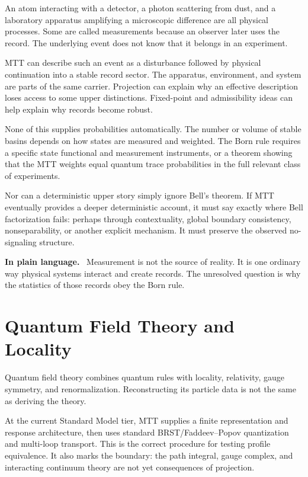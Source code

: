 \documentclass[11pt,openany]{book}
\newenvironment{plainsummary}
  {\par\small\noindent\textbf{In plain language.}\ }
  {\par}
\begin{document}
An atom interacting with a detector, a photon scattering from dust, and a
laboratory apparatus amplifying a microscopic difference are all physical
processes. Some are called measurements because an observer later uses the
record. The underlying event does not know that it belongs in an experiment.

MTT can describe such an event as a disturbance followed by physical
continuation into a stable record sector. The apparatus, environment, and
system are parts of the same carrier. Projection can explain why an effective
description loses access to some upper distinctions. Fixed-point and
admissibility ideas can help explain why records become robust.

None of this supplies probabilities automatically. The number or volume of
stable basins depends on how states are measured and weighted. The Born rule
requires a specific state functional and measurement instruments, or a
theorem showing that the MTT weights equal quantum trace probabilities in the
full relevant class of experiments.

Nor can a deterministic upper story simply ignore Bell's theorem. If MTT
eventually provides a deeper deterministic account, it must say exactly where
Bell factorization fails: perhaps through contextuality, global boundary
consistency, nonseparability, or another explicit mechanism. It must preserve
the observed no-signaling structure.

\begin{plainsummary}
Measurement is not the source of reality. It is one ordinary way physical
systems interact and create records. The unresolved question is why the
statistics of those records obey the Born rule.
\end{plainsummary}

\chapter{Quantum Field Theory and Locality}

Quantum field theory combines quantum rules with locality, relativity, gauge
symmetry, and renormalization. Reconstructing its particle data is not the
same as deriving the theory.

At the current Standard Model tier, MTT supplies a finite representation and
response architecture, then uses standard BRST/Faddeev--Popov quantization and
multi-loop transport. This is the correct procedure for testing profile
equivalence. It also marks the boundary: the path integral, gauge complex,
and interacting continuum theory are not yet consequences of projection.
\end{document}
